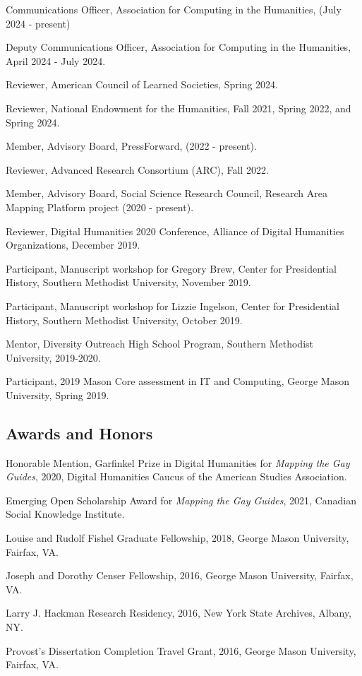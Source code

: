 \documentclass[11pt]{article}
\begin{document}
Communications Officer, Association for Computing in the Humanities, (July 2024 - present)

Deputy Communications Officer, Association for Computing in the Humanities, April 2024 - July 2024.

Reviewer, American Council of Learned Societies, Spring 2024.

Reviewer, National Endowment for the Humanities, Fall 2021, Spring 2022, and Spring 2024.

Member, Advisory Board, PressForward, (2022 - present).

Reviewer, Advanced Research Consortium (ARC), Fall 2022. 

Member, Advisory Board, Social Science Research Council, Research Area Mapping Platform project (2020 - present).

Reviewer, Digital Humanities 2020 Conference, Alliance of Digital Humanities Organizations, December 2019.

Participant, Manuscript workshop for Gregory Brew, Center for Presidential History, Southern Methodist University, November 2019.

Participant, Manuscript workshop for Lizzie Ingelson, Center for Presidential History, Southern Methodist University, October 2019.

Mentor, Diversity Outreach High School Program, Southern Methodist University, 2019-2020.

Participant, 2019 Mason Core assessment in IT and Computing, George Mason University, Spring 2019.

\subsection{Awards and Honors}
Honorable Mention, Garfinkel Prize in Digital Humanities for \emph{Mapping the Gay Guides}, 2020, Digital Humanities Caucus of the American Studies Association.

Emerging Open Scholarship Award for \emph{Mapping the Gay Guides}, 2021, Canadian Social Knowledge Institute.

Louise and Rudolf Fishel Graduate Fellowship, 2018, George Mason University, Fairfax, VA.

Joseph and Dorothy Censer Fellowship, 2016, George Mason University, Fairfax, VA.

Larry J. Hackman Research Residency, 2016, New York State Archives, Albany, NY.

Provost's Dissertation Completion Travel Grant, 2016, George Mason University, Fairfax, VA.
\end{document}
